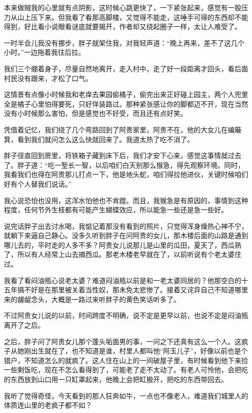 本来做贼我的心里就有点阴影，这时候心跳更快了，一下紧张起来，感觉有一股压力从山上压下来。但我看了看那高脚楼，又觉得不能走，这唾手可得的东西却不能得到，好比看小说眼看谜底就要揭开，作者却又绕起圈子一样，太让人难受了。

一时半会儿我没有挪步，胖子就架住我，对我轻声道：“晚上再来，差不了这几个小时。”一边拖着我往后拉。

我们三个绷着身子，尽量自然地离开，走入村中，走了好一段距离才回头，看后面村民没有跟来，才松了口气。

这情景有点像小时候我和老痒去果园偷橘子，偷完出来正好碰上园主，两个人兜里全是橘子心里怕得要死，只好佯装路过。那种紧张感让你的脚都迈不开，现在当然没有小时候那么害怕，但是感觉也不好受，而且还有点好笑。

凭借着记忆，我们绕了几个弯路回到了阿贵家里，阿贵不在，他的大女儿在编簸箕，看到我们就问怎么这么快就回来了。我道太热了吃不消了。

胖子径直回到房里，将铁箱子藏到床下后，我们才安下心来，感觉这事情就过去了。胖子道：“吃一堑长一智，以后咱们白天别那么猴急，得先观察环境。同时，我看我们也得在阿贵那儿打点一下，他是地头蛇，咱们得拉他进伙，关键时候咱们好有个人替我们说话。”

我心说恐怕也没用，这浑水怕他也不肯蹚。而且，我猴急是有原因的，事情到这种程度，任何节外生枝都有可能产生蝴蝶效应，所以能急一些还是急一些好。

说完话胖子出去讨水喝，我惦记着那没有看到的照片，只觉得浑身燥热心神不宁，就躺下来逼自己静心。没多久听到胖子在问阿贵的女儿，那木楼后面的山路是通到哪儿去的，平时走的人多不多？阿贵女儿说那儿是山里的瓜田，夏天了，西瓜熟了，所以有人经常上山去摘西瓜。那老木楼老早就在了，以前听说有个老太婆住过。

我看了看闷油瓶心说老太婆？难道闷油瓶以前是和一老太婆同居的？他那空白的十五年搞不好是在那里被关着当性奴，那未免太悲惨了。接着又诧异自己不知道哪里来的龌龊念头，大概是一路过来听胖子的黄色笑话听多了。

不过阿贵女儿说的以前，时间跨度不明确，说不定是更早以前，也说不定是闷油瓶离开了之后。

之后，胖子问了阿贵女儿那个蓬头垢面男的事，一问之下还真有这么一个人。这疯子从她刚出生就在了，也不知道是谁，村里人都叫他“阿玉儿子”，好像以前也是个猎户，不知道怎么的就疯了。这人住在山上的一间破屋子里，有时候看到他下来捡一些剩饭吃，现在不怎么看得到了，可能老了走不太动了。有老人可怜他，会把吃的东西放到山口用一只缸罩起来，他晚上会把缸搬开，把吃的东西带回去。

我听了觉得奇怪，今天看到的那人狂奔如牛，一点也不像老人，难道我们城里人的体质连山里的老疯子都不如？

